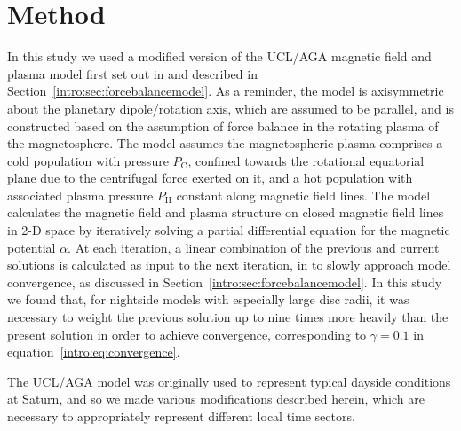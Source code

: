 \section{Method}\label{LTsectors:sec:method}
In this study we used a modified version of the UCL/AGA magnetic field and plasma model first set out in \citet{achilleos2010a} and described in Section~\ref{intro:sec:forcebalancemodel}. As a reminder, the model is axisymmetric about the planetary dipole/rotation axis, which are assumed to be parallel, and is constructed based on the assumption of force balance in the rotating plasma of the magnetosphere. The model assumes the magnetospheric plasma comprises a cold population with pressure $P_\mathrm{C}$, confined towards the rotational equatorial plane due to the centrifugal force exerted on it, and a hot population with associated plasma pressure $P_\mathrm{H}$ constant along magnetic field lines. The model calculates the magnetic field and plasma structure on closed magnetic field lines in 2-D space by iteratively solving a partial differential equation for the magnetic potential $\alpha$. At each iteration, a linear combination of the previous and current solutions is calculated as input to the next iteration, in to slowly approach model convergence, as discussed in Section~\ref{intro:sec:forcebalancemodel}.  In this study we found that, for nightside models with especially large disc radii, it was necessary to weight the previous solution up to nine times more heavily than the present solution in order to achieve convergence, corresponding  to $\gamma=0.1$ in equation~\ref{intro:eq:convergence}.

The UCL/AGA model was originally used to represent typical dayside conditions at Saturn, and so we made various modifications described herein, which are necessary to appropriately represent different local time sectors.

